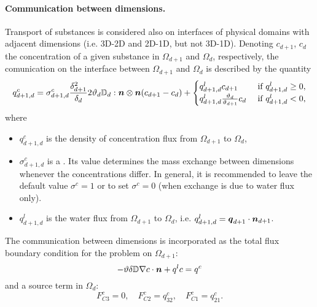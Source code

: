 \paragraph{Communication between dimensions.}
Transport of substances is considered also on interfaces of physical domains with adjacent dimensions (i.e. 3D-2D and 2D-1D, but not 3D-1D).
Denoting $c_{d+1}$, $c_d$ the concentration of a given substance in $\Omega_{d+1}$ and $\Omega_d$, respectively, the comunication on the interface between $\Omega_{d+1}$ and $\Omega_d$ is described by the quantity
\begin{equation}
  \label{e:inter_dim_flux}
  q^c_{d+1,d} = \sigma^c_{d+1,d} \frac{\delta_{d+1}^2}{\delta_d}2\th_d\D_d:\n\otimes\n ( c_{d+1} - c_d) + \begin{cases}q^l_{d+1,d} c_{d+1} & \mbox{ if }q^l_{d+1,d}\ge 0,\\q^l_{d+1,d} \frac{\th_d}{\th_{d+1}} c_d & \mbox{ if }q^l_{d+1,d}<0,\end{cases}
\end{equation}
where
\begin{itemize}
\item $q^c_{d+1,d}$  is the density of concentration flux from $\Omega_{d+1}$ to $\Omega_d$,
\item $\sigma^c_{d+1,d}$ \units{}{}{} is a .
Its value determines the mass exchange between dimensions whenever the concentrations differ.
In general, it is recommended to leave the default value $\sigma^c=1$ or to set $\sigma^c=0$ (when exchange is due to water flux only).
\item $q^l_{d+1,d}$  is the water flux from $\Omega_{d+1}$ to $\Omega_d$, i.e. $q^l_{d+1,d} = \mathbf{\boldsymbol{q}}_{d+1}\cdot\mathbf{\boldsymbol{n}}_{d+1}$.
\end{itemize}
The communication between dimensions is incorporated as the total flux boundary condition for the problem on $\Omega_{d+1}$:
\begin{equation}
\label{e:FC}
-\th\delta\D\nabla c\cdot\vc n + q^l c = q^c
\end{equation}
and a source term in $\Omega_d$:
\begin{equation}
F^c_{C3} = 0,\quad
F^c_{C2} = q^c_{32},\quad
F^c_{C1} = q^c_{21}.
\end{equation}



